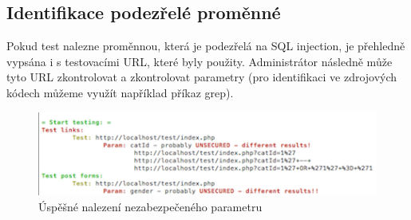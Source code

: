\subsection{Identifikace podezřelé proměnné}
Pokud test nalezne proměnnou, která je podezřelá na SQL injection, je přehledně vypsána i s testovacími URL, které byly použity. Administrátor následně může tyto URL zkontrolovat a zkontrolovat parametry (pro identifikaci ve zdrojových kódech můžeme využít například příkaz  grep).
\begin{figure}[h!]
\centerline{\includegraphics[]{./examples/SID-succ2.png}}
\caption{Úspěšné nalezení nezabezpečeného parametru}
\label{chart.attack}
\end{figure}